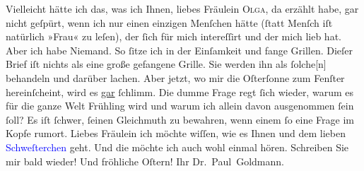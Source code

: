 \pstart
           Vielleicht hätte ich das, was ich Ihnen, liebes Fräulein \textsc{Olga}, da erzählt habe, gar nicht geſpürt, wenn ich \strikeout{\textcolor{gray}{×}} nur einen einzigen Menſchen hätte (ſtatt Menſch iſt natürlich »Frau« zu
               leſen), der ſich für mich intereſſirt und der mich lieb hat. Aber ich habe {\pb}Niemand. So ſitze ich in der Einſamkeit und fange
               Grillen. Dieſer Brief iſt nichts als eine große gefangene Grille. Sie werden ihn als
                  ſolche{[}n{]} behandeln und darüber lachen. Aber jetzt, wo mir die
                  Oſterſonne zum Fenſter hereinſcheint, wird es \uline{gar} ſchlimm. Die dumme Frage regt ſich wieder, warum
               es für die ganze Welt Frühling wird und warum ich allein davon ausgenommen ſein ſoll?
               Es iſt ſchwer, ſeinen Gleichmuth zu bewahren, wenn einem ſo eine Frage im Kopfe
               rumort.\pend
           \pstart Liebes Fräulein ich möchte wiſſen, wie es Ihnen und dem lieben \textcolor{blue}{Schweſterchen}{}\ledrightnote{{$\rightarrow$}\textcolor{blue}{Elisabeth Steinrück}} geht. Und die \label{K_L03524-3v}\label{K_L03524-3h} möchte ich auch wohl einmal hören. Schreiben Sie mir bald wieder!
               Und fröhliche Oſtern! Ihr \spacefill\mbox{Dr. Paul
                  Goldmann.}\pend{}
\pstart
           \noindent{}{\pb}\label{T_L03524-3v}\label{T_L03524-3h}\pend
           \endnumbering{}
\begin{anhang}
\end{anhang}
      